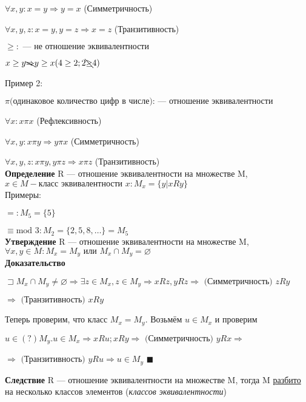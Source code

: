 \documentclass[a4paper, 12pt] {article}
\begin{document}
	$\forall x, y: x=y \Rightarrow y=x$ (Симметричность)
	
	$\forall x, y, z: x=y, y=z \Rightarrow x=z$ (Транзитивность)
	
	$ \ge: \text{ --- не отношение эквивалентности }$
	
	$x \ge y \bcancel \Rightarrow y \ge x (4 \ge 2; 2 \bcancel \ge 4)$
	
	Пример 2:
	
	$ \pi \text{(одинаковое количество цифр в числе): --- отношение эквивалентности }$
	
	$\forall x: x \pi x$ (Рефлексивность)
	
	$\forall x, y: x \pi y \Rightarrow y \pi x$ (Симметричность)
	
	$\forall x, y, z: x \pi y, y \pi z \Rightarrow x \pi z$ (Транзитивность)\\
	
	\textbf{Определение} 
	R --- отношение эквивалентности на множестве M, $x \in M - \text{класс эквивалентности } x: M_{x} = \{y | xRy\}$\\
	
	
	Примеры:
	
	$=: M_{5}=\{5\}$
	
	$\equiv \text{mod 3}: M_{2}=\{2, 5, 8, \dots \} = M_{5}$\\
	
	
	\textbf{Утверждение} 
	R --- отношение эквивалентности на множестве M, $ \forall x, y \in M: M_{x} =  M_{y} \text{ или } M_{x} \cap M_{y} = \varnothing$\\
	
	
	\textbf{Доказательство}
	
	$\sqsupset M_{x} \cap M_{y} \ne \varnothing \Rightarrow \exists z \in M_{x}, z \in M_{y} \Rightarrow xRz, yRz \Rightarrow \text{ (Симметричность) } zRy $  
	
	$\Rightarrow \text{ (Транзитивность) } xRy$
	
	Теперь проверим, что класс $M_{x} =  M_{y}$. Возьмём $u \in M_{x} \text{ и проверим }$ 
	
	$u \in (?) M_{y}. u \in M_{x} \Rightarrow xRu; xRy \Rightarrow \text{ (Симметричность) } yRx \Rightarrow $ 
	
	 $ \Rightarrow \text{ (Транзитивность) } yRu \Rightarrow u \in M_{y} $   $\blacksquare $
	
	\textbf{Следствие}
	R --- отношение эквивалентности на множестве M, тогда M \underline{разбито} на несколько классов элементов (\textit{классов эквивалентности})
	
\end{document}
